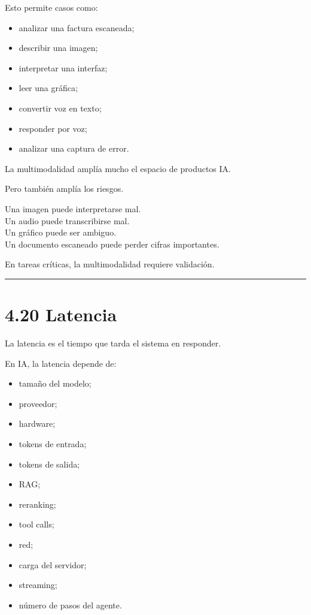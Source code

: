Esto permite casos como:

\begin{itemize}
\tightlist
\item
  analizar una factura escaneada;
\item
  describir una imagen;
\item
  interpretar una interfaz;
\item
  leer una gráfica;
\item
  convertir voz en texto;
\item
  responder por voz;
\item
  analizar una captura de error.
\end{itemize}

La multimodalidad amplía mucho el espacio de productos IA.

Pero también amplía los riesgos.

Una imagen puede interpretarse mal.\\
Un audio puede transcribirse mal.\\
Un gráfico puede ser ambiguo.\\
Un documento escaneado puede perder cifras importantes.

En tareas críticas, la multimodalidad requiere validación.

\begin{center}\rule{0.5\linewidth}{0.5pt}\end{center}

\section{4.20 Latencia}\label{latencia-2}

La latencia es el tiempo que tarda el sistema en responder.

En IA, la latencia depende de:

\begin{itemize}
\tightlist
\item
  tamaño del modelo;
\item
  proveedor;
\item
  hardware;
\item
  tokens de entrada;
\item
  tokens de salida;
\item
  RAG;
\item
  reranking;
\item
  tool calls;
\item
  red;
\item
  carga del servidor;
\item
  streaming;
\item
  número de pasos del agente.
\end{itemize}

